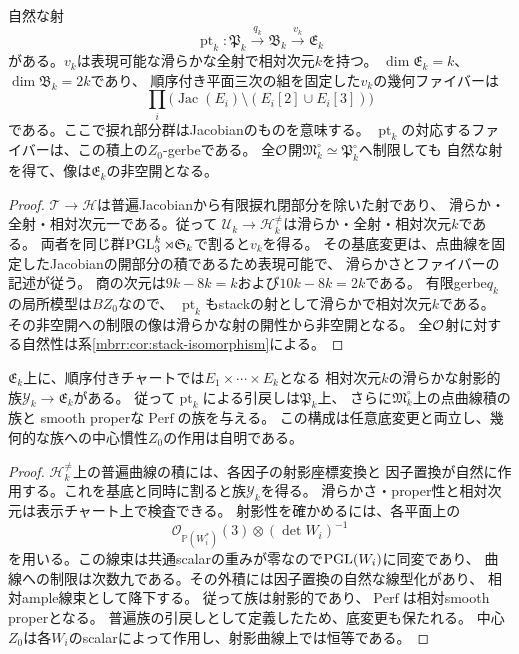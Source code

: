 \begin{proposition}[点曲線のモジュライへの射]
\label{mbfm:prop:point-map}
自然な射
\begin{equation}\label{mbfm:eq:point-map}
 \operatorname{pt}_k:\mathfrak P_k
 \xrightarrow{q_k}\mathfrak B_k
 \xrightarrow{v_k}\mathfrak E_k
\end{equation}
がある。$v_k$は表現可能な滑らかな全射で相対次元$k$を持つ。
$\dim\mathfrak E_k=k$、$\dim\mathfrak B_k=2k$であり、
順序付き平面三次の組を固定した$v_k$の幾何ファイバーは
\[
 \prod_i\bigl(\operatorname{Jac}(E_i)
       \setminus(E_i[2]\cup E_i[3])\bigr)
\]
である。ここで捩れ部分群はJacobianのものを意味する。
$\operatorname{pt}_k$の対応するファイバーは、この積上の$Z_0$-gerbeである。
全$\mathcal O$開$\mathfrak M_k^\circ\simeq\mathfrak P_k^\circ$へ制限しても
自然な射を得て、像は$\mathfrak E_k$の非空開となる。
\end{proposition}
\begin{proof}
$\mathcal T\to\mathcal H$は普遍Jacobianから有限捩れ閉部分を除いた射であり、
滑らか・全射・相対次元一である。従って
$\mathcal U_k\to\mathcal H_k^{\ne}$は滑らか・全射・相対次元$k$である。
両者を同じ群$\operatorname{PGL}_3^k\rtimes\mathfrak S_k$で割ると$v_k$を得る。
その基底変更は、点曲線を固定したJacobianの開部分の積であるため表現可能で、
滑らかさとファイバーの記述が従う。
商の次元は$9k-8k=k$および$10k-8k=2k$である。
有限gerbe$q_k$の局所模型は$BZ_0$なので、
$\operatorname{pt}_k$もstackの射として滑らかで相対次元$k$である。
その非空開への制限の像は滑らかな射の開性から非空開となる。
全$\mathcal O$射に対する自然性は系\ref{mbrr:cor:stack-isomorphism}による。
\end{proof}

\begin{proposition}
\label{mbfm:prop:product-family}
$\mathfrak E_k$上に、順序付きチャートでは$E_1\times\cdots\times E_k$となる
相対次元$k$の滑らかな射影的族$\mathscr Y_k\to\mathfrak E_k$がある。
従って$\operatorname{pt}_k$による引戻しは$\mathfrak P_k$上、
さらに$\mathfrak M_k^\circ$上の点曲線積の族と
smooth properな$\operatorname{Perf}$の族を与える。
この構成は任意底変更と両立し、幾何的な族への中心慣性$Z_0$の作用は自明である。
\end{proposition}
\begin{proof}
$\mathcal H_k^{\ne}$上の普遍曲線の積には、各因子の射影座標変換と
因子置換が自然に作用する。これを基底と同時に割ると族$\mathscr Y_k$を得る。
滑らかさ・proper性と相対次元は表示チャート上で検査できる。
射影性を確かめるには、各平面上の
\[
 \mathcal O_{\mathbb P(W_i^*)}(3)\otimes(\det W_i)^{-1}
\]
を用いる。この線束は共通scalarの重みが零なので$\operatorname{PGL}(W_i)$に同変であり、
曲線への制限は次数九である。その外積には因子置換の自然な線型化があり、
相対ample線束として降下する。
従って族は射影的であり、$\operatorname{Perf}$は相対smooth properとなる。
普遍族の引戻しとして定義したため、底変更も保たれる。
中心$Z_0$は各$W_i$のscalarによって作用し、射影曲線上では恒等である。
\end{proof}

